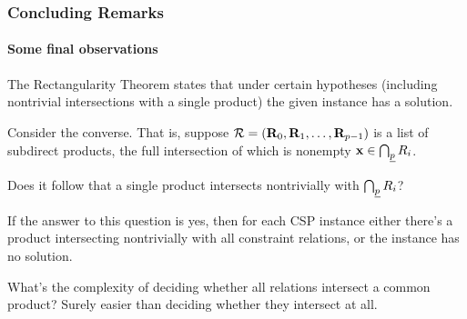 \documentclass[9pt,xcolor=dvipsnames%
   ]{beamer}
\newcommand{\csp}{\acs{CSP}\xspace}
\begin{document}
\begin{frame} \frametitle{Concluding Remarks}
 \framesubtitle{Some final observations}

  The Rectangularity Theorem states that under certain hypotheses (including nontrivial
  intersections with a single \mas product) the given instance has a solution.

  \bigskip

  Consider the converse.  That is, suppose
  $\mathcal{R} = (\mathbf{R}_0, \mathbf{R}_1,\dots, \mathbf{R}_{p-1})$ is a list of subdirect products,
  the full intersection of which is nonempty $\mathbf{x} \in \bigcap_{\underline{p}} R_i$.
  
  \bigskip

  Does it follow that a single \mas product intersects nontrivially with
  $\bigcap_{\underline{p}} R_i$?

  \bigskip
  
  If the answer to this question is yes, then for each \csp instance either
  there's a \mas product intersecting nontrivially with 
  all constraint relations, or the instance has no solution.

  \bigskip
  What's the complexity of deciding whether all relations intersect a common
  \mas product?  Surely easier than deciding whether they intersect at all.

  \bigskip

  \begin{center}
  \end{center}
  
\end{frame}
\end{document}

